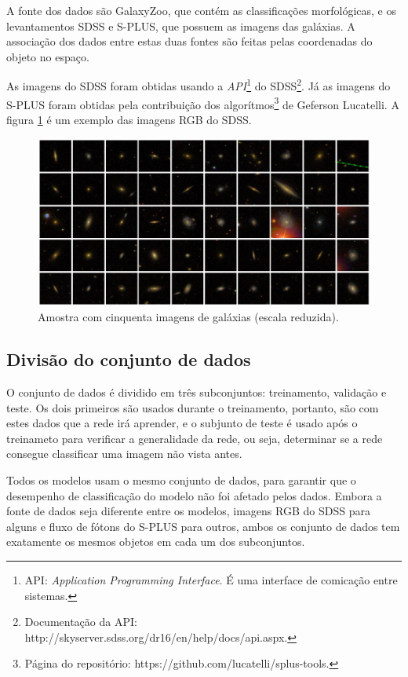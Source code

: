 A fonte dos dados são GalaxyZoo, que contém as classificações morfológicas, e os levantamentos SDSS e S-PLUS, que possuem as imagens das galáxias. A associação dos dados entre estas duas fontes são feitas pelas coordenadas do objeto no espaço.

As imagens do SDSS foram obtidas usando a \emph{API}\footnote{API: \emph{Application Programming Interface}. É uma interface de comicação entre sistemas.} do SDSS\footnote{Documentação da API: http://skyserver.sdss.org/dr16/en/help/docs/api.aspx.}. Já as imagens do S-PLUS foram obtidas pela contribuição dos algorítmos\footnote{Página do repositório: https://github.com/lucatelli/splus-tools.} de Geferson Lucatelli. A figura \ref{fig:galaxy_grid} é um exemplo das imagens RGB do SDSS.

\begin{figure}[h!]
  \centering
  \includegraphics[width=\textwidth]{figures/galaxy_grid.jpg}
  \caption{Amostra com cinquenta imagens de galáxias (escala reduzida).}
  \label{fig:galaxy_grid}
\end{figure}

\subsection{Divisão do conjunto de dados}

O conjunto de dados é dividido em três subconjuntos: treinamento, validação e teste. Os dois primeiros são usados durante o treinamento, portanto, são com estes dados que a rede irá aprender, e o subjunto de teste é usado após o treinameto para verificar a generalidade da rede, ou seja, determinar se a rede consegue classificar uma imagem não vista antes.

Todos os modelos usam o mesmo conjunto de dados, para garantir que o desempenho de classificação do modelo não foi afetado pelos dados. Embora a fonte de dados seja diferente entre os modelos, imagens RGB do SDSS para alguns e fluxo de fótons do S-PLUS para outros, ambos os conjunto de dados tem exatamente os mesmos objetos em cada um dos subconjuntos.

